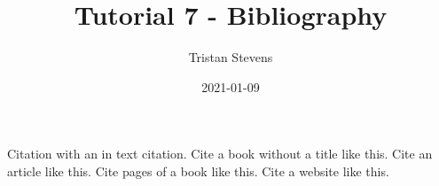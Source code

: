 \documentclass{article}
\title{Tutorial 7 - Bibliography}
\date{2021-01-09}
\author{Tristan Stevens}
\begin{document}
\maketitle
\newpage

Citation \cite{DUMMY:1} with an in text citation.
Cite a book without a title \cite{BOOK:2} like this.
Cite an article \cite{ARTICLE:1} like this.
Cite pages of a book \cite{BOOK:2} like this.
Cite a website \cite{WEBSITE:1} like this.

\newpage



\end{document}
